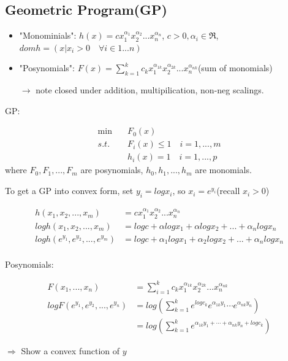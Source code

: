 \subsection{Geometric Program(GP)}

\begin{itemize}
	\item "Monominials": $h(x) = cx_1^{\alpha_1}x_2^{\alpha_2}...x_n^{\alpha_n}$, $c>0, \alpha_i\in \Re$, $domh = (x\vert x_i>0 \quad \forall i\in {1...n})$
	
	\item "Posynomials": $F(x) = \sum^k_{k=1}c_kx_1^{\alpha_{1k}}x_2^{\alpha_{2k}}...x_n^{\alpha_{nk}}$(sum of monomials)
	
	$\rightarrow$ note closed under addition, multipilication, non-neg scalings.
\end{itemize}
GP: 

\begin{align*}
\min\quad &F_0(x)\\
s.t. \quad&F_i(x)\leq 1\quad i = 1,...,m\\
&h_i(x)= 1\quad i = 1,...,p
\end{align*}
where $F_0, F_1,...,F_m$ are posynomials, $h_0, h_1,...,h_m$ are monomials.

To get a GP into convex form, set $y_i = log x_i$, so $x_i = e^{y_i}$(recall $x_i > 0$)

\begin{align*}
h(x_1,x_2,...,x_m) &= cx_1^{\alpha_1}x_2^{\alpha_2}...x_n^{\alpha_n}\\
log h(x_1,x_2,...,x_m) &= logc + \alpha log x_1 +\alpha log x_2 + ... + \alpha_n log x_n\\
log h(e^{y_1},e^{y_2},...,e^{y_m}) &= logc + \alpha_1 log x_1 +\alpha_2 log x_2 + ... + \alpha_n log x_n\\
\end{align*}

Posynomials:

\begin{align*}
F(x_1,...,x_n) &= \sum^k_{i=1}c_kx_1^{\alpha_{1k}}x_2^{\alpha_{2k}}...x_n^{\alpha_{nk}}\\
log F(e^{y_1},e^{y_2},...,e^{y_n}) &= log(\sum^k_{k=1}e^{logc_k}e^{\alpha_{1k}y_1}\cdots e^{\alpha_{nk}y_n})\\
&=log(\sum^k_{k=1}e^{\alpha_{1k}y_1+\cdots+\alpha_{nk}y_n+logc_k})
\end{align*}

$\Rightarrow$ Show a convex function of $y$

